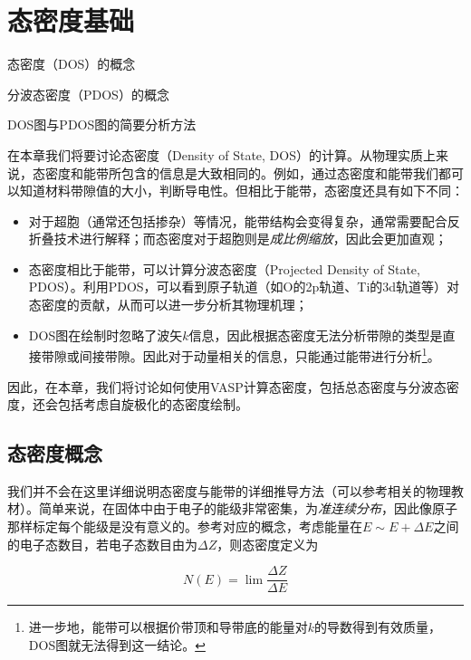 \section{态密度基础}\label{sec:态密度基础}

\begin{Abstract}
    \item 态密度（DOS）的概念
    \item 分波态密度（PDOS）的概念
    \item DOS图与PDOS图的简要分析方法
\end{Abstract}

在本章我们将要讨论态密度（Density of State, DOS）的计算。从物理实质上来说，态密度和能带所包含的信息是大致相同的。例如，通过态密度和能带我们都可以知道材料带隙值的大小，判断导电性。但相比于能带，态密度还具有如下不同：

\begin{itemize}
    \item 对于超胞（通常还包括掺杂）等情况，能带结构会变得复杂，通常需要配合反折叠技术进行解释；而态密度对于超胞则是\emph{成比例缩放}，因此会更加直观；
    \item 态密度相比于能带，可以计算分波态密度（Projected Density of State, PDOS）。利用PDOS，可以看到原子轨道（如O的2p轨道、Ti的3d轨道等）对态密度的贡献，从而可以进一步分析其物理机理；
    \item DOS图在绘制时忽略了波矢$k$信息，因此根据态密度无法分析带隙的类型是直接带隙或间接带隙。因此对于动量相关的信息，只能通过能带进行分析\footnote{进一步地，能带可以根据价带顶和导带底的能量对$k$的导数得到有效质量，DOS图就无法得到这一结论。}。
\end{itemize}

因此，在本章，我们将讨论如何使用VASP计算态密度，包括总态密度与分波态密度，还会包括考虑自旋极化的态密度绘制。

\subsection{态密度概念}\label{subsec:态密度基础-态密度概念}

我们并不会在这里详细说明态密度与能带的详细推导方法（可以参考相关的物理教材）。简单来说，在固体中由于电子的能级非常密集，为\emph{准连续分布}，因此像原子那样标定每个能级是没有意义的。参考对应的概念，考虑能量在$E\sim E+\Delta E$之间的电子态数目，若电子态数目由为$\Delta Z$，则态密度定义为

\begin{equation*}
    N(E)=\lim\limits\frac{\Delta Z}{\Delta E}
\end{equation*}

